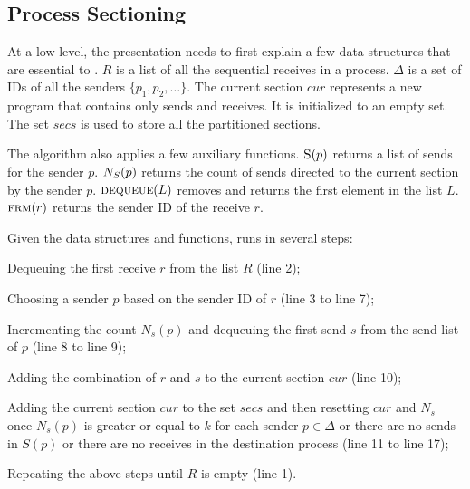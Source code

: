 \subsection{Process Sectioning}

At a low level, the presentation needs to first explain a few data structures that are essential to .
$R$ is a list of all the sequential receives in a process.
$\Delta$ is a set of IDs of all the senders $\{p_1, p_2, \ldots\}$.
The current section $\mathit{cur}$ represents a new program that contains only sends and receives. It is initialized to an empty set.
The set $\mathit{secs}$ is used to store all the partitioned sections.

The algorithm also applies a few auxiliary functions. 
$\Call{S}{p}$ returns a list of sends for the sender $p$.
$\Call{$N_S$}{p}$ returns the count of sends directed to the current section by the sender $p$.
$\Call{dequeue}{L}$ removes and returns the first element in the list $L$.
$\Call{frm}{r}$ returns the sender ID of the receive $r$.

Given the data structures and functions,  runs in several steps: 
\begin{compactenum}
\item Dequeuing the first receive $r$ from the list $R$ (line 2);
\item Choosing a sender $p$ based on the sender ID of $r$ (line 3 to line 7);
\item Incrementing the count $N_s(p)$ and dequeuing the first send $s$ from the send list of $p$ (line 8 to line 9);
\item Adding the combination of $r$ and $s$ to the current section $\mathit{cur}$ (line 10);
\item Adding the current section $\mathit{cur}$ to the set $\mathit{secs}$ and then resetting $\mathit{cur}$ and $N_s$ once $N_s(p)$ is greater or equal to $k$ for each sender $p\in\Delta$ or there are no sends in $S(p)$ or there are no receives in the destination process (line 11 to line 17);
\item Repeating the above steps until $R$ is empty (line 1).
\end{compactenum}



